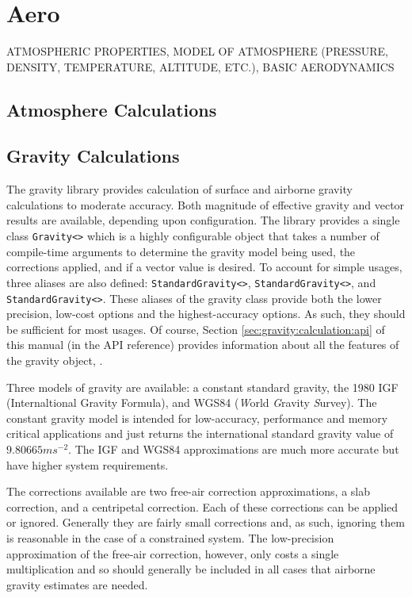 \documentclass[10pt,letterpaper]{memoir} %
\begin{document}
\section{Aero}
ATMOSPHERIC PROPERTIES, MODEL OF ATMOSPHERE (PRESSURE, DENSITY, TEMPERATURE, ALTITUDE, ETC.), BASIC AERODYNAMICS
\subsection{Atmosphere Calculations}
\subsection{Gravity Calculations}
The gravity library provides calculation of surface and airborne gravity calculations to moderate accuracy.  Both magnitude of effective gravity and vector results are available, depending upon configuration.  The library provides a single class \texttt{Gravity<>} which is a highly configurable object that takes a number of compile-time arguments to determine the gravity model being used, the corrections applied, and if a vector value is desired.  To account for simple usages, three aliases are also defined: \texttt{StandardGravity<>}, \texttt{StandardGravity<>}, and \texttt{StandardGravity<>}.  These aliases of the gravity class provide both the lower precision, low-cost options and the highest-accuracy options.  As such, they should be sufficient for most usages.  Of course, Section \ref{sec:gravity:calculation:api} of this manual (in the API reference) provides information about all the features of the gravity object, . 

Three models of gravity are available: a constant standard gravity, the 1980 IGF (Internaltional Gravity Formula), and WGS84 (\emph{W}orld \emph{G}ravity \emph{S}urvey).  The constant gravity model is intended for low-accuracy, performance and memory critical applications and just returns the international standard gravity value of $9.80665 ms^{-2}$.  The IGF and WGS84 approximations are much more accurate but have higher system requirements.

The corrections available are two free-air correction approximations, a slab correction, and a centripetal correction.  Each of these corrections can be applied or ignored.  Generally they are fairly small corrections and, as such, ignoring them is reasonable in the case of a constrained system.  The low-precision approximation of the free-air correction, however, only costs a single multiplication and so should generally be included in all cases that airborne gravity estimates are needed.
\end{document}
